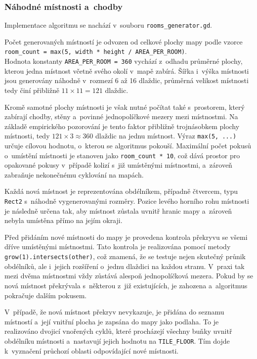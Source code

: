 \documentclass[
   program=itk,
   biblatex,
   figures=true,
   tables=true,
   glossaries,
   index
]{kidiplom}
\begin{document}
\subsubsection{Náhodné místnosti a~chodby}

Implementace algoritmu se nachází v~souboru \texttt{rooms\_generator.gd}.

Počet generovaných místností je odvozen od celkové plochy mapy podle vzorce \\ \texttt{room\_count = max(5, width * height / AREA\_PER\_ROOM)}. \\ Hodnota konstanty \texttt{AREA\_PER\_ROOM = 360} vychází z~odhadu průměrné plochy, kterou jedna místnost včetně svého okolí v~mapě zabírá. Šířka i~výška místnosti jsou generovány náhodně v~rozmezí 6 až 16 dlaždic, průměrná velikost místnosti tedy činí přibližně $11 \times 11 = 121$ dlaždic. 

Kromě samotné plochy místnosti je však nutné počítat také s~prostorem, který zabírají chodby, stěny a~povinné jednopolíčkové mezery mezi místnostmi. Na základě empirického pozorování je tento faktor přibližně trojnásobkem plochy místnosti, tedy $121 \times 3 \approx 360$ dlaždic na jednu místnost. Výraz \texttt{max(5, ...)} určuje cílovou hodnotu, o~kterou se algoritmus pokouší. Maximální počet pokusů o~umístění místnosti je stanoven jako \texttt{room\_count * 10}, což dává prostor pro opakované pokusy v~případě kolizí s~již umístěnými místnostmi, a~zároveň zabraňuje nekonečnému cyklování na mapách.

Každá nová místnost je reprezentována obdélníkem, případně čtvercem, typu \texttt{Rect2} s~náhodně vygenerovanými rozměry. Pozice levého horního rohu místnosti je následně určena tak, aby místnost zůstala uvnitř hranic mapy a~zároveň nebyla umístěna přímo na jejím okraji.

Před přidáním nové místnosti do mapy je provedena kontrola překryvu se všemi dříve umístěnými místnostmi. Tato kontrola je realizována pomocí metody \texttt{grow(1).intersects(other)}, což znamená, že se testuje nejen skutečný průnik obdélníků, ale i~jejich rozšíření o~jednu dlaždici na každou stranu. V~praxi tak mezi dvěma místnostmi vždy zůstává alespoň jednopolíčková mezera. Pokud by se nová místnost překrývala s~některou z~již existujících, je zahozena a~algoritmus pokračuje dalším pokusem.

V~případě, že nová místnost překryv nevykazuje, je přidána do seznamu místností a~její vnitřní plocha je zapsána do mapy jako podlaha. To je realizováno dvojicí vnořených cyklů, které procházejí všechny buňky uvnitř obdélníku místnosti a~nastavují jejich hodnotu na \texttt{TILE\_FLOOR}. Tím dojde k~vyznačení průchozí oblasti odpovídající nové místnosti.
\end{document}
